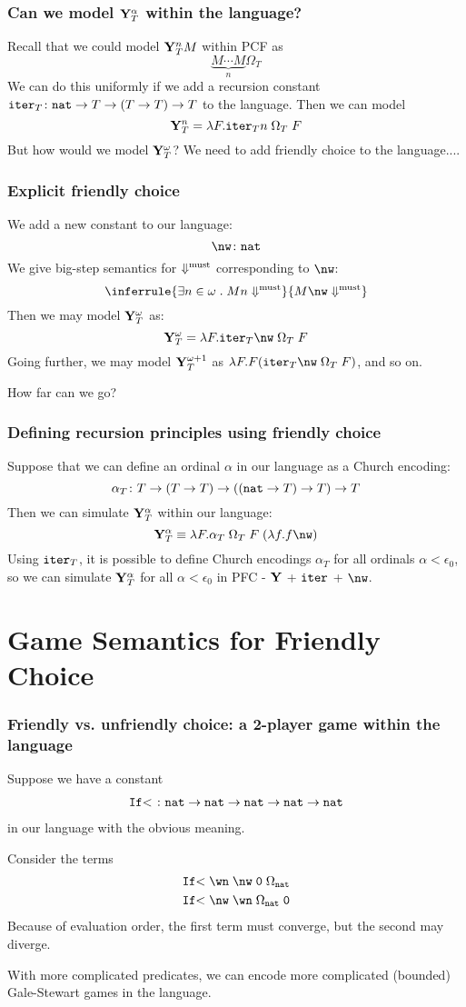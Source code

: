 \documentclass{beamer}
\begin{document}
\begin{frame}
  \frametitle{Can we model $\mathbf{Y}_T^\alpha$ within the language?}
  \pause
  Recall that we could model $\mathbf{Y}_T^n M$ within PCF as
  \[
    \underbrace{M\cdots M}_{n}\Omega_T
    \]
  \pause
  We can do this uniformly if we add a recursion constant ${\mathtt{iter}}_T\colon {\mathtt{nat}}\to T\to(T\to T)\to T$ to the language.  Then we can model
  \[
    \mathbf{Y}_T^n = \lambda F.{\mathtt{iter}}_T n\;\Omega_T\;F
    \]
  \pause
  But how would we model $\mathbf{Y}_T^\omega$?  We need to add friendly choice to the language....
\end{frame}

\begin{frame}
  \frametitle{Explicit friendly choice}
  \pause
  We add a new constant to our language:
  \[
    \nw\from\nat
    \]
  \pause
  We give big-step semantics for $\Downarrow^{\text{must}}$ corresponding to $\nw$:
  \[
    \inferrule{\exists n\in\omega\esuchthat Mn\mustconverge}{M\nw\mustconverge}
    \]
  Then we may model $\mathbf{Y}_T^\omega$ as:
  \[
    \Y_T^\omega = \lambda F.\rec_T \nw\;\Omega_T\;F
    \]
  \pause
  Going further, we may model $\mathbf{Y}_T^{\omega+1}$ as $\lambda F.F(\rec_T\nw\;\Omega_T\;F)$, and so on.  

  \pause
  How far can we go?
\end{frame}

\begin{frame}
  \frametitle{Defining recursion principles using friendly choice}
  \pause
  Suppose that we can define an ordinal $\alpha$ in our language as a Church encoding:
  \[
    \alpha_T\colon T \to (T \to T) \to (({\mathtt{nat}} \to T) \to T) \to T
    \]
  \pause
  Then we can simulate $\mathbf{Y}_T^\alpha$ within our language:
  \[
    \Y_T^\alpha\equiv \lambda F.\alpha_T\;\Omega_T\;F\;(\lambda f.f\nw)
    \]
  \pause
  Using  ${\mathtt{iter}}_T$, it is possible to define Church encodings $\alpha_T$ for all ordinals $\alpha<\epsilon_0$, so we can simulate $\mathbf{Y}_T^\alpha$ for all $\alpha<\epsilon_0$ in PFC - $\mathbf{Y}$ + ${\mathtt{iter}}$ + $\nw$.
\end{frame}

\section{Game Semantics for Friendly Choice}

\begin{frame}
  \frametitle{Friendly vs. unfriendly choice: a 2-player game within the language}
  \pause
  Suppose we have a constant
  \begin{gather*}
    \mathtt{If{<}\;}\colon{\mathtt{nat}}\to{\mathtt{nat}}\to{\mathtt{nat}}\to{\mathtt{nat}}\to{\mathtt{nat}}
  \end{gather*}
  in our language with the obvious meaning.

  \pause
  Consider the terms
  \begin{gather*}
    \Iflt \wn\;\nw\;\0\;\Omega_\nat\\
    \Iflt \nw\;\wn\;\Omega_\nat\;\0
  \end{gather*}
  \pause
  Because of evaluation order, the first term must converge, but the second may diverge.

  \pause
  With more complicated predicates, we can encode more complicated (bounded) Gale-Stewart games in the language.
\end{frame}
\end{document}
